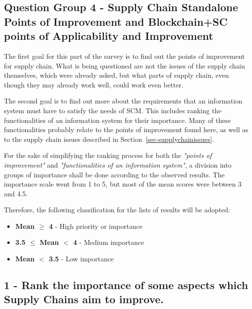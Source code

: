 
\subsection{Question Group 4 - Supply Chain Standalone Points of Improvement and Blockchain+SC points of Applicability and Improvement}
\label{sec-survey-improvement-functionalities}

The first goal for this part of the survey is to find out the points of improvement for supply chain. What is being questioned are not the issues of the supply chain themselves, which were already asked, but what parts of supply chain, even though they may already work well, could work even better.

The second goal is to find out more about the requirements that an information system must have to satisfy the needs of SCM. This includes ranking the functionalities of an information system for their importance. Many of these functionalities probably relate to the points of improvement found here, as well as to the supply chain issues described in Section~\ref{sec-supplychainissues}.




For the sake of simplifying the ranking process for both the \textit{"points of improvement"} and \textit{"functionalities of an information system"}, a division into groups of importance shall be done according to the observed results. The importance scale went from 1 to 5, but most of the mean scores were between 3 and 4.5. 

Therefore, the following classification for the lists of results will be adopted: 

\begin{itemize}
    \item \textbf{Mean 	$\geq$ 4} - High priority or importance
    \item \textbf{3.5 $\leq$ Mean $<$ 4} - Medium importance 
    \item \textbf{Mean $<$ 3.5} - Low importance
\end{itemize}

\subsection*{1 - Rank the importance of some aspects which Supply Chains aim to improve.}
 
